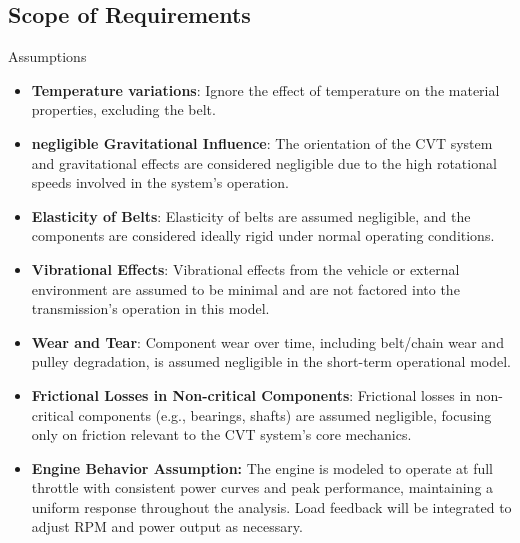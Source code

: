 \documentclass[12pt]{article}
\begin{document}
\subsection{Scope of Requirements}




Assumptions
\begin{itemize}
  \item \textbf{Temperature variations}: Ignore the effect of temperature on the material properties, excluding the belt.
  \item \textbf{negligible Gravitational Influence}: The orientation of the CVT system and gravitational effects are considered negligible due to the high rotational speeds involved in the system's operation.
  \item \textbf{Elasticity of Belts}: Elasticity of belts are assumed negligible, and the components are considered ideally rigid under normal operating conditions.
  \item \textbf{Vibrational Effects}: Vibrational effects from the vehicle or external environment are assumed to be minimal and are not factored into the transmission’s operation in this model.
  \item \textbf{Wear and Tear}: Component wear over time, including belt/chain wear and pulley degradation, is assumed negligible in the short-term operational model.
  \item \textbf{Frictional Losses in Non-critical Components}: Frictional losses in non-critical components (e.g., bearings, shafts) are assumed negligible, focusing only on friction relevant to the CVT system's core mechanics.
  \item \textbf{Engine Behavior Assumption:} The engine is modeled to operate at full throttle with consistent power curves and peak performance, maintaining a uniform response throughout the analysis. Load feedback will be integrated to adjust RPM and power output as necessary.
\end{itemize}
\end{document}
